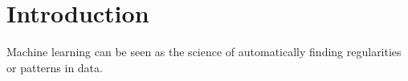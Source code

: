 \section{Introduction}

Machine learning can be seen as the science of automatically finding regularities or patterns in data. 

